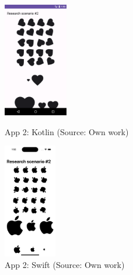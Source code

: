 \begin{figure}[H]
  \begin{minipage}{.47\textwidth}
    \centering
    \includegraphics[height=50mm]{img/app2_kotlin}
    \caption{App 2: Kotlin (Source: Own work)}
    \label{fig:app2_kotlin}
  \end{minipage}
  \hfill
  \begin{minipage}{.47\textwidth}
    \centering
    \includegraphics[height=50mm]{img/app2_swift}
    \caption{App 2: Swift (Source: Own work)}
    \label{fig:app2_swift}
  \end{minipage}
\end{figure}

